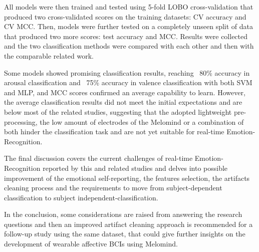 All models were then trained and tested using 5-fold LOBO cross-validation that produced two cross-validated scores on the training datasets: CV accuracy and CV MCC. Then, models were further tested on a completely unseen split of data that produced two more scores: test accuracy and MCC. Results were collected and the two classification methods were compared with each other and then with the comparable related work. 

Some models showed promising classification results, reaching ~80\% accuracy in arousal classification and ~75\% accuracy in valence classification with both SVM and MLP, and MCC scores confirmed an average capability to learn. However, the average classification results did not meet the initial expectations and are below  most of the related studies, suggesting that the adopted lightweight pre-processing, the low amount of electrodes of the Melomind or a combination of both hinder the classification task and are not yet suitable for real-time Emotion-Recognition.

The final discussion covers the current challenges of real-time Emotion-Recognition reported by this and related studies and delves into possible improvement of the emotional self-reporting, the features selection, the artifacts cleaning process and the requirements to move from subject-dependent classification to subject independent-classification.

In the conclusion, some considerations are raised from answering the research questions and then an improved artifact cleaning approach is recommended for a follow-up study using the same dataset, that could give further insights on the development of wearable affective BCIs using Melomind.
